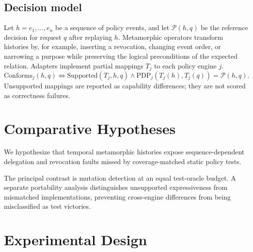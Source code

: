 \documentclass[11pt,a4paper]{article}
\begin{document}
\subsection{Decision model}
Let $h=e_1,\ldots,e_n$ be a sequence of policy events, and let $\mathcal{P}(h,q)$ be the reference decision for request $q$ after replaying $h$. Metamorphic operators transform histories by, for example, inserting a revocation, changing event order, or narrowing a purpose while preserving the logical preconditions of the expected relation. Adapters implement partial mappings $T_j$ to each policy engine $j$.
\begin{equation}
\mathrm{Conforms}_j(h,q)\Longleftrightarrow
\mathrm{Supported}(T_j,h,q)\land
\mathrm{PDP}_j(T_j(h),T_j(q))=\mathcal{P}(h,q).
\end{equation}
Unsupported mappings are reported as capability differences; they are not scored as correctness failures.

\section{Comparative Hypotheses}
We hypothesize that temporal metamorphic histories expose sequence-dependent delegation and revocation faults missed by coverage-matched static policy tests.

The principal contrast is mutation detection at an equal test-oracle budget. A separate portability analysis distinguishes unsupported expressiveness from mismatched implementations, preventing cross-engine differences from being misclassified as test victories.

\section{Experimental Design}
\end{document}
